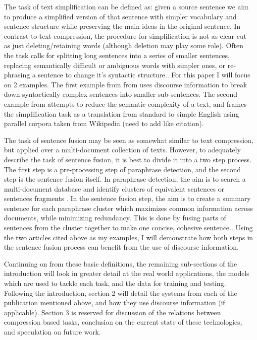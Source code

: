 {The task of text simplification can be defined as: given a source sentence we aim to produce a simplified version of that sentence with simpler vocabulary and sentence structure while preserving the main ideas in the original sentence\citet{Feng2008}.  In contrast to text compression, the procedure for simplification is not as clear cut as just deleting/retaining words (although deletion may play some role). Often the task calls for splitting long sentences into a series of smaller sentences, replacing semantically difficult or ambiguous words with simpler ones, or re-phrasing a sentence to change it's syntactic structure.\citet{Coster,Kauchak2011}.  For this paper I will focus on 2 examples. The first example from from \citet{Siddharthan2006} uses discourse information to break down syntactically complex sentences into smaller sub-sentences.  The second example from \citet{Coster,Kauchak2011} attempts to reduce the semantic complexity of a text, and frames the simplification task as a translation from standard to simple English using parallel corpora taken from Wikipedia (need to add like citation).}
 
{The task of sentence fusion may be seen as somewhat similar to text compression, but applied over a multi-document collection of texts.  However, to adequately describe the task of sentence fusion, it is best to divide it into a two step process. The first step is a pre-processing step of paraphrase detection, and the second step is the sentence fusion itself.  In paraphrase detection, the aim is to search a multi-document database  and identify clusters of equivalent sentences or sentences fragments \citet{Regneri,Wang2012}. In the sentence fusion step, the aim is to create a summary sentence for each paraphrase cluster which maximizes common information across documents, while minimizing redundancy.  This is done by fusing parts of sentences from the cluster together to make one concise, cohesive sentence.\citet{Filippova, Strube2008}.  Using the two articles cited above as my examples, I will demonstrate how both steps in the sentence fusion process can benefit from the use of discourse information.}

{Continuing on from these basic definitions, the remaining sub-sections of the introduction will look in greater detail at the real world applications, the models which are used to tackle each task, and the data for training and testing.  Following the introduction, section 2 will detail the systems from each of the publication mentioned above, and how they use discourse information (if applicable). Section 3 is reserved for discussion of the relations between compression based tasks, conclusion on the current state of these technologies, and speculation on future work.}



